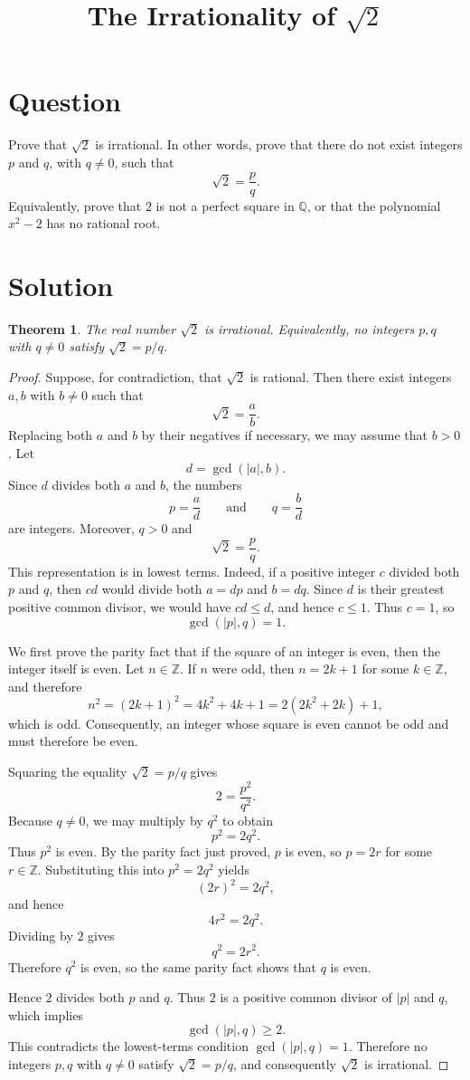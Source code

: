 \documentclass[11pt]{article}
\title{The Irrationality of $\sqrt{2}$}
\author{}
\date{}
\newtheorem*{theorem}{Theorem}
\begin{document}
\maketitle

\section*{Question}
Prove that $\sqrt{2}$ is irrational. In other words, prove that there do not exist integers $p$ and $q$, with $q\ne 0$, such that
\[
\sqrt{2}=\frac{p}{q}.
\]
Equivalently, prove that $2$ is not a perfect square in $\mathbb{Q}$, or that the polynomial $x^2-2$ has no rational root.

\section*{Solution}

\begin{theorem}
The real number $\sqrt{2}$ is irrational. Equivalently, no integers $p,q$ with $q\ne 0$ satisfy $\sqrt{2}=p/q$.
\end{theorem}

\begin{proof}
Suppose, for contradiction, that $\sqrt{2}$ is rational. Then there exist integers $a,b$ with $b\ne 0$ such that
\[
\sqrt{2}=\frac{a}{b}.
\]
Replacing both $a$ and $b$ by their negatives if necessary, we may assume that $b>0$. Let
\[
d=\gcd(|a|,b).
\]
Since $d$ divides both $a$ and $b$, the numbers
\[
p=\frac{a}{d}
\qquad\text{and}\qquad
q=\frac{b}{d}
\]
are integers. Moreover, $q>0$ and
\[
\sqrt{2}=\frac{p}{q}.
\]
This representation is in lowest terms. Indeed, if a positive integer $c$ divided both $p$ and $q$, then $cd$ would divide both $a=dp$ and $b=dq$. Since $d$ is their greatest positive common divisor, we would have $cd\le d$, and hence $c\le 1$. Thus $c=1$, so
\[
\gcd(|p|,q)=1.
\]

We first prove the parity fact that if the square of an integer is even, then the integer itself is even. Let $n\in\mathbb{Z}$. If $n$ were odd, then $n=2k+1$ for some $k\in\mathbb{Z}$, and therefore
\[
n^2=(2k+1)^2=4k^2+4k+1=2(2k^2+2k)+1,
\]
which is odd. Consequently, an integer whose square is even cannot be odd and must therefore be even.

Squaring the equality $\sqrt{2}=p/q$ gives
\[
2=\frac{p^2}{q^2}.
\]
Because $q\ne 0$, we may multiply by $q^2$ to obtain
\[
p^2=2q^2.
\]
Thus $p^2$ is even. By the parity fact just proved, $p$ is even, so $p=2r$ for some $r\in\mathbb{Z}$. Substituting this into $p^2=2q^2$ yields
\[
(2r)^2=2q^2,
\]
and hence
\[
4r^2=2q^2.
\]
Dividing by $2$ gives
\[
q^2=2r^2.
\]
Therefore $q^2$ is even, so the same parity fact shows that $q$ is even.

Hence $2$ divides both $p$ and $q$. Thus $2$ is a positive common divisor of $|p|$ and $q$, which implies
\[
\gcd(|p|,q)\ge 2.
\]
This contradicts the lowest-terms condition $\gcd(|p|,q)=1$. Therefore no integers $p,q$ with $q\ne 0$ satisfy $\sqrt{2}=p/q$, and consequently $\sqrt{2}$ is irrational.
\end{proof}
\end{document}
